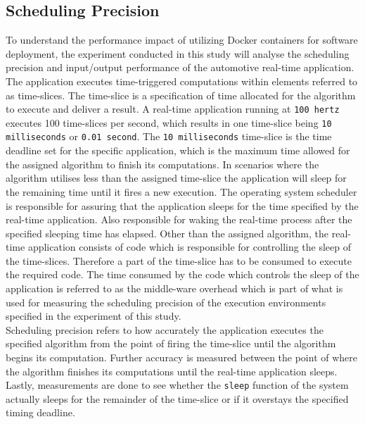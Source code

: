 \subsection{Scheduling Precision}
To understand the performance impact of utilizing Docker containers for software deployment, the experiment conducted in this study will analyse the scheduling precision and input/output performance of the automotive real-time application. The application executes time-triggered computations within elements referred to as time-slices. The time-slice is a specification of time allocated for the algorithm to execute and deliver a result. A real-time application running at \texttt{100 hertz} executes 100 time-slices per second, which results in one time-slice being \texttt{10 milliseconds} or \texttt{0.01 second}. The \texttt{10 milliseconds} time-slice is the time deadline set for the specific application, which is the maximum time allowed for the assigned algorithm to finish its computations. In scenarios where the algorithm utilises less than the assigned time-slice the application will sleep for the remaining time until it fires a new execution. The operating system scheduler is responsible for assuring that the application sleeps for the time specified by the real-time application. Also responsible for waking the real-time process after the specified sleeping time has elapsed. Other than the assigned algorithm, the real-time application consists of code which is responsible for controlling the sleep of the time-slices. Therefore a part of the time-slice has to be consumed to execute the required code. The time consumed by the code which controls the sleep of the application is referred to as the middle-ware overhead which is part of what is used for measuring the scheduling precision of the execution environments specified in the experiment of this study.\\

Scheduling precision refers to how accurately the application executes the specified algorithm from the point of firing the time-slice until the algorithm begins its computation. Further accuracy is measured between the point of where the algorithm finishes its computations until the real-time application sleeps. Lastly, measurements are done to see whether the \texttt{sleep} function of the system actually sleeps for the remainder of the time-slice or if it overstays the specified timing deadline.\\

